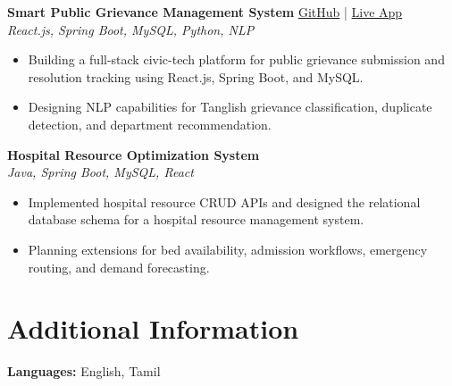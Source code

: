 \documentclass[10pt,a4paper]{article}
\begin{document}
\textbf{Smart Public Grievance Management System}
\hfill
\href{https://github.com/pravinkumarAmirthalingam/Smart-Public-Grievance-Managment-System}{GitHub}
\;|\;
\href{https://smart-public-grievance-managment.vercel.app}{Live App}\\
\textit{React.js, Spring Boot, MySQL, Python, NLP}
\begin{itemize}
    \item Building a full-stack civic-tech platform for public grievance submission and resolution tracking using React.js, Spring Boot, and MySQL.
    \item Designing NLP capabilities for Tanglish grievance classification, duplicate detection, and department recommendation.
\end{itemize}

\textbf{Hospital Resource Optimization System}\\
\textit{Java, Spring Boot, MySQL, React}
\begin{itemize}
    \item Implemented hospital resource CRUD APIs and designed the relational database schema for a hospital resource management system.
    \item Planning extensions for bed availability, admission workflows, emergency routing, and demand forecasting.
\end{itemize}

\section{Additional Information}
\textbf{Languages:} English, Tamil
\end{document}
